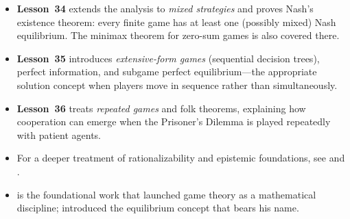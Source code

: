 \documentclass[11pt,a4paper]{article}
\begin{document}
\begin{itemize}[nosep]
    \item \textbf{Lesson~34} extends the analysis to \emph{mixed strategies}
    and proves Nash's existence theorem: every finite game has at least one
    (possibly mixed) Nash equilibrium.  The minimax theorem for zero-sum
    games is also covered there.
    \item \textbf{Lesson~35} introduces \emph{extensive-form games}
    (sequential decision trees), perfect information, and subgame perfect
    equilibrium---the appropriate solution concept when players move in
    sequence rather than simultaneously.
    \item \textbf{Lesson~36} treats \emph{repeated games} and folk theorems,
    explaining how cooperation can emerge when the Prisoner's Dilemma is
    played repeatedly with patient agents.
    \item For a deeper treatment of rationalizability and epistemic
    foundations, see \citet[Chapters 4--5]{osborne1994} and
    \citet[Chapter 2]{fudenberg1991}.
    \item \citet{vonneumann1944} is the foundational work that launched game
    theory as a mathematical discipline; \citet{nash1951} introduced the
    equilibrium concept that bears his name.
\end{itemize}

\bigskip

\end{document}
